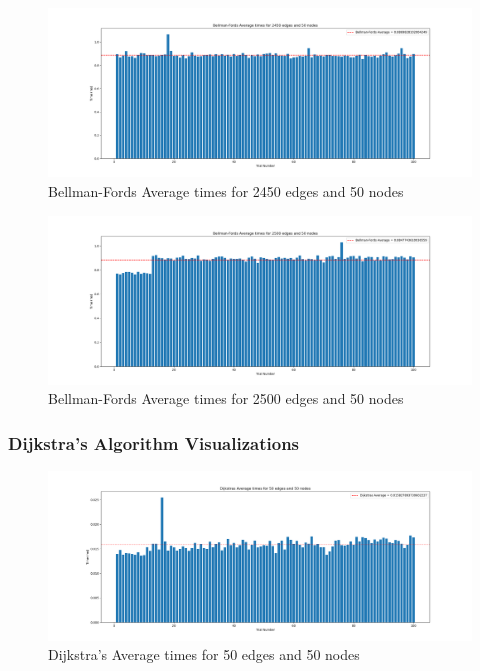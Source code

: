 \documentclass[12pt]{article}
\begin{document}
\begin{figure}[H]
    \centering
    \includegraphics[width=\textwidth]{images/Bellman-Fords Average times for 2450 edges and 50 nodes.png}
    \caption{Bellman-Fords Average times for 2450 edges and 50 nodes}
\end{figure}

\begin{figure}[H]
    \centering
    \includegraphics[width=\textwidth]{images/Bellman-Fords Average times for 2500 edges and 50 nodes.png}
    \caption{Bellman-Fords Average times for 2500 edges and 50 nodes}
\end{figure}

\subsubsection*{Dijkstra's Algorithm Visualizations}

\begin{figure}[H]
    \centering
    \includegraphics[width=\textwidth]{images/Dijkstras Average times for 50 edges and 50 nodes.png}
    \caption{Dijkstra's Average times for 50 edges and 50 nodes}
\end{figure}
\end{document}
